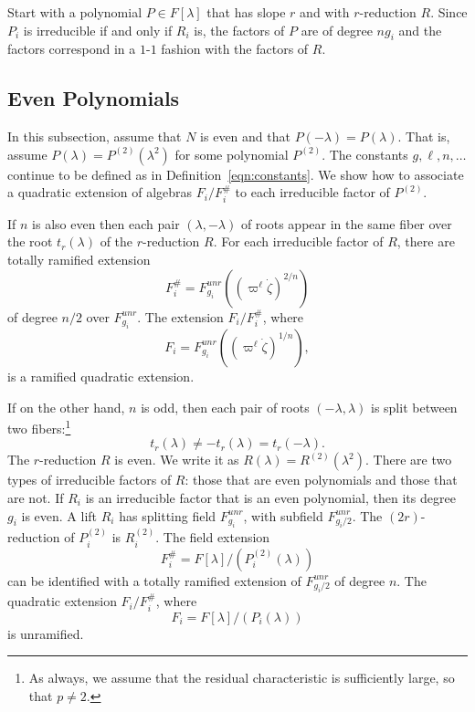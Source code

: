\documentclass[11pt]{amsart}
\theoremstyle{definition}
\theoremstyle{remark}
\numberwithin{equation}{theorem}
\def\lb{\text{\#}}
\begin{document}
Start with a polynomial $P\in F[\lambda]$ that has slope $r$ and
with $r$-reduction $R$.  Since $P_i$ is irreducible if and only if
$R_i$ is, the factors of $P$ are of degree $n g_i$ and the factors
correspond in a $1$-$1$ fashion with the factors of $R$.

\subsection{Even Polynomials}\label{sec:even}

In this subsection, assume that $N$ is even and that
$P(-\lambda)=P(\lambda)$. That is, assume $P(\lambda) =
P^{(2)}(\lambda^2)$ for some polynomial $P^{(2)}$.  The constants
$g,\ell,n,\ldots$ continue to be defined as in
Definition~\ref{eqn:constants}. We show how to associate a
quadratic extension of algebras $F_i/F_i^\lb$ to each irreducible
factor of $P^{(2)}$.

If $n$ is also even then each pair $(\lambda,-\lambda)$ of roots
appear in the same fiber over the root $t_r(\lambda)$ of the
$r$-reduction $R$. For each irreducible factor of $R$, there are
totally ramified extension
\begin{equation}F_i^\lb=F^{unr}_{g_i}((\varpi^\ell\dot\zeta)^{2/n})\end{equation}
of degree
$n/2$ over $F^{unr}_{g_i}$. The extension $F_i/F_i^\lb$, where
   \begin{equation}F_i =F^{unr}_{g_i}((\varpi^\ell\dot\zeta)^{1/n}),
   \end{equation}
is a ramified quadratic extension.

If on the other hand, $n$ is odd, then each pair of roots
$(-\lambda,\lambda)$ is split between two fibers:\footnote{As
always, we assume that the residual characteristic is sufficiently
large, so that $p\ne2$.}
    \begin{equation}t_r(\lambda)\ne
-t_r(\lambda)=t_r(-\lambda).\end{equation}
The $r$-reduction $R$ is even. We write it as
$R(\lambda)=R^{(2)}(\lambda^2)$.  There are two types of
irreducible factors of $R$: those that are even polynomials and
those that are not. If $R_i$ is an irreducible factor that is an
even polynomial, then its degree $g_i$ is even.  A lift $R_i$ has
splitting field $F^{unr}_{g_i}$, with subfield $F^{unr}_{g_i/2}$.
The $(2r)$-reduction of $P^{(2)}_i$ is $R^{(2)}_i$. The field
extension
    \begin{equation}F_i^\lb = F[\lambda]/(P^{(2)}_i(\lambda))\end{equation}
can be identified with a
totally ramified extension of $F^{unr}_{g_i/2}$ of degree $n$. The
quadratic extension $F_i/F_i^\lb$, where
\begin{equation}F_i=F[\lambda]/(P_i(\lambda))\end{equation} is unramified.
\end{document}
